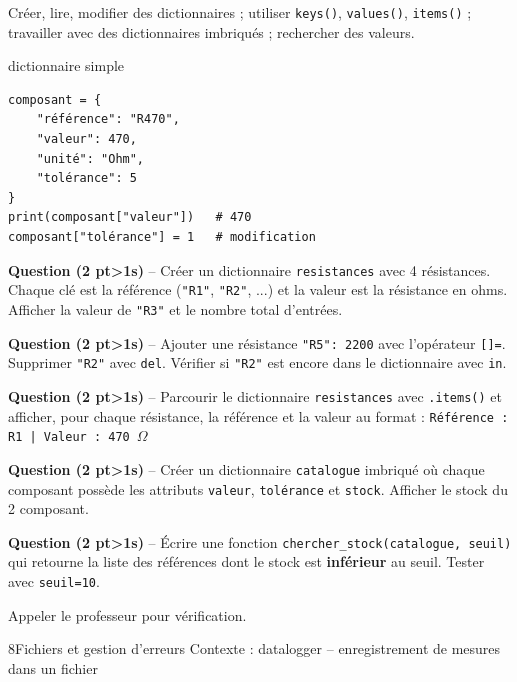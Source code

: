 \documentclass[11pt,a4paper]{article}
\newcommand{\cadreblanc}[1]{%
  \medskip\framebox[\linewidth][c]{\rule{0mm}{#1mm}}\par\medskip}
\newcounter{qnum}
\newcommand{\resetq}{\setcounter{qnum}{0}}
\newcommand{\q}[2]{%
  \stepcounter{qnum}%
  \noindent\textbf{Question \theqnum{} \normalfont(#2 pt\ifnum#2>1s\fi)} -- #1\par\smallskip}
\begin{document}
\begin{objectifbox}{}
  Créer, lire, modifier des dictionnaires ; utiliser \texttt{keys()}, \texttt{values()}, \texttt{items()} ; travailler avec des dictionnaires imbriqués ; rechercher des valeurs.
\end{objectifbox}

\begin{codebox}{dictionnaire simple}
\begin{lstlisting}
composant = {
    "référence": "R470",
    "valeur": 470,
    "unité": "Ohm",
    "tolérance": 5
}
print(composant["valeur"])   # 470
composant["tolérance"] = 1   # modification
\end{lstlisting}
\end{codebox}

\q{Créer un dictionnaire \texttt{resistances} avec 4 résistances. Chaque clé est la référence (\texttt{"R1"}, \texttt{"R2"}, ...) et la valeur est la résistance en ohms. Afficher la valeur de \texttt{"R3"} et le nombre total d'entrées.}{2}
\cadreblanc{20}

\q{Ajouter une résistance \texttt{"R5": 2200} avec l'opérateur \texttt{[]=}. Supprimer \texttt{"R2"} avec \texttt{del}. Vérifier si \texttt{"R2"} est encore dans le dictionnaire avec \texttt{in}.}{2}
\cadreblanc{20}

\q{Parcourir le dictionnaire \texttt{resistances} avec \texttt{.items()} et afficher, pour chaque résistance, la référence et la valeur au format :
\texttt{Référence : R1 | Valeur : 470 $\Omega$}}{2}
\cadreblanc{22}

\q{Créer un dictionnaire \texttt{catalogue} imbriqué où chaque composant possède les attributs \texttt{valeur}, \texttt{tolérance} et \texttt{stock}. Afficher le stock du 2\ieme{} composant.}{2}
\cadreblanc{24}

\q{Écrire une fonction \texttt{chercher\_stock(catalogue, seuil)} qui retourne la liste des références dont le stock est \textbf{inférieur} au seuil. Tester avec \texttt{seuil=10}.}{2}
\cadreblanc{24}

\begin{appelbox}
  \centering Appeler le professeur pour vérification.
\end{appelbox}

\clearpage
\resetq
\begin{tptitre}{8}{Fichiers et gestion d'erreurs}
  Contexte : datalogger -- enregistrement de mesures dans un fichier
\end{tptitre}
\end{document}
